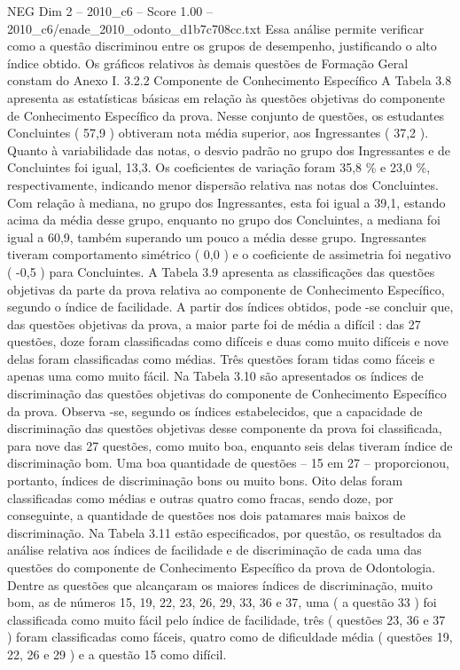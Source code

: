\begin{textsample}{NEG Dim 2 – 2010\_c6 – Score 1.00 – 2010\_c6/enade\_2010\_odonto\_d1b7c708cc.txt}
Essa análise permite verificar como a questão discriminou entre os grupos de desempenho, justificando o alto índice obtido.
Os gráficos relativos às demais questões de Formação Geral constam do Anexo I. 3.2.2 Componente de Conhecimento Específico A Tabela 3.8 apresenta as estatísticas básicas em relação às questões objetivas do componente de Conhecimento Específico da prova.
Nesse conjunto de questões, os estudantes Concluintes ( 57,9 ) obtiveram nota média superior, aos Ingressantes ( 37,2 ).
Quanto à variabilidade das notas, o desvio padrão no grupo dos Ingressantes e de Concluintes foi igual, 13,3.
Os coeficientes de variação foram 35,8 \% e 23,0 \%, respectivamente, indicando menor dispersão relativa nas notas dos Concluintes.
Com relação à mediana, no grupo dos Ingressantes, esta foi igual a 39,1, estando acima da média desse grupo, enquanto no grupo dos Concluintes, a mediana foi igual a 60,9, também superando um pouco a média desse grupo.
Ingressantes tiveram comportamento simétrico ( 0,0 ) e o coeficiente de assimetria foi negativo ( -0,5 ) para Concluintes.
A Tabela 3.9 apresenta as classificações das questões objetivas da parte da prova relativa ao componente de Conhecimento Específico, segundo o índice de facilidade.
A partir dos índices obtidos, pode -se concluir que, das questões objetivas da prova, a maior parte foi de média a difícil : das 27 questões, doze foram classificadas como difíceis e duas como muito difíceis e nove delas foram classificadas como médias.
Três questões foram tidas como fáceis e apenas uma como muito fácil.
Na Tabela 3.10 são apresentados os índices de discriminação das questões objetivas do componente de Conhecimento Específico da prova.
Observa -se, segundo os índices estabelecidos, que a capacidade de discriminação das questões objetivas desse componente da prova foi classificada, para nove das 27 questões, como muito boa, enquanto seis delas tiveram índice de discriminação bom.
Uma boa quantidade de questões – 15 em 27 – proporcionou, portanto, índices de discriminação bons ou muito bons.
Oito delas foram classificadas como médias e outras quatro como fracas, sendo doze, por conseguinte, a quantidade de questões nos dois patamares mais baixos de discriminação.
Na Tabela 3.11 estão especificados, por questão, os resultados da análise relativa aos índices de facilidade e de discriminação de cada uma das questões do componente de Conhecimento Específico da prova de Odontologia.
Dentre as questões que alcançaram os maiores índices de discriminação, muito bom, as de números 15, 19, 22, 23, 26, 29, 33, 36 e 37, uma ( a questão 33 ) foi classificada como muito fácil pelo índice de facilidade, três ( questões 23, 36 e 37 ) foram classificadas como fáceis, quatro como de dificuldade média ( questões 19, 22, 26 e 29 ) e a questão 15 como difícil.

\end{textsample}
